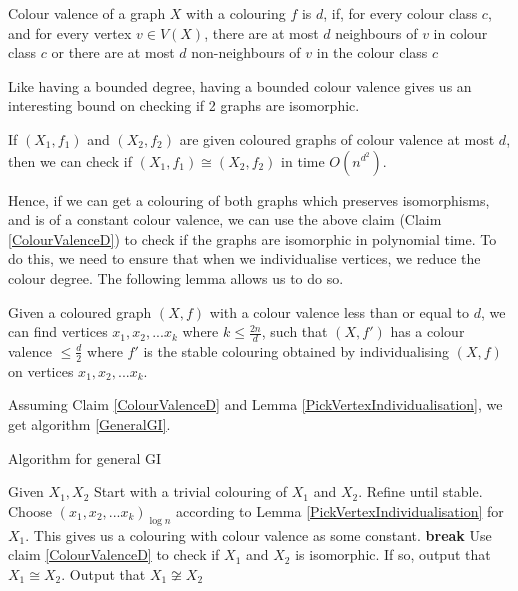\begin{definition}
Colour valence of a graph $X$ with a colouring $f$ is $d$, if, for every colour class $c$, and for every vertex $v \in V(X)$, there are at most $d$ neighbours of $v$ in colour class $c$ or there are at most $d$ non-neighbours of $v$ in the colour class $c$
\end{definition}

Like having a bounded degree, having a bounded colour valence gives us an interesting bound on checking if 2 graphs are isomorphic.
\begin{claim}\label{ColourValenceD}
If $(X_1, f_1)$ and $(X_2, f_2)$ are given coloured graphs of colour valence at most $d$, then we can check if $(X_1, f_1) \cong (X_2, f_2)$ in time $O(n^{d^2})$.
\end{claim}

Hence, if we can get a colouring of both graphs which preserves isomorphisms, and is of a constant colour valence, we can use the above claim (Claim \ref{ColourValenceD}) to check if the graphs are isomorphic in polynomial time. 
To do this, we need to ensure that when we individualise vertices, we reduce the colour degree. The following lemma allows us to do so.

\begin{lemma} \label{PickVertexIndividualisation}
Given a coloured graph $(X, f)$ with a colour valence less than or equal to $d$, we can find vertices $x_1, x_2, ... x_k$ where $k \le \frac{2n}{d}$, such that $(X, f')$ has a colour valence $\le \frac{d}{2}$ where $f'$ is the stable colouring obtained by individualising $(X,f)$ on vertices $x_1, x_2, ... x_k$.
\end{lemma}  

Assuming Claim \ref{ColourValenceD} and Lemma \ref{PickVertexIndividualisation}, we get algorithm \ref{GeneralGI}.

\begin{algorithm}[htp!]
\caption{Algorithm for general GI}\label{GeneralGI}
\label{alg:generalGI}
\begin{algorithmic}[1]
\State Given $X_1, X_2$
\State Start with a trivial colouring of $X_1$ and $X_2$. Refine until stable.
\State Choose $(x_1, x_2, ...x_k)_{\log n}$ according to Lemma \ref{PickVertexIndividualisation} for $X_1$. This gives us a colouring with colour valence as some constant.
		\State \textbf{break}
	\Else
		\State Use claim \ref{ColourValenceD} to check if $X_1$ and $X_2$ is isomorphic.
		\State If so, output that $X_1 \cong X_2$.
	\EndIf
\EndFor
\State Output that $X_1 \not \cong X_2$
\EndProcedure
\end{algorithmic}
\end{algorithm}


